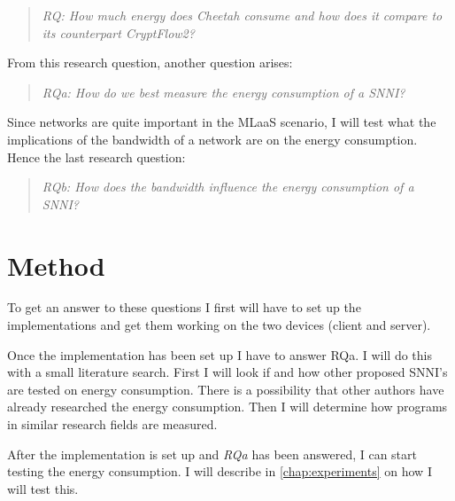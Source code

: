 \documentclass[../thesis.tex]{subfiles}
\begin{document}
\begin{quote} \emph{RQ: How much energy does Cheetah consume and how does it compare to its counterpart CryptFlow2?} \end{quote} 

\noindent From this research question, another question arises:

\begin{quote} \emph{RQa: How do we best measure the energy consumption of a SNNI?} \end{quote}

\noindent Since networks are quite important in the MLaaS scenario, I will test what the implications of the bandwidth of a network are on the energy consumption. Hence the last research question:

\begin{quote}
    \emph{RQb: How does the bandwidth influence the energy consumption of a SNNI?}
\end{quote}


\section{Method}
To get an answer to these questions I first will have to set up the implementations and get them working on the two devices (client and server). 

Once the implementation has been set up I have to answer RQa. I will do this with a small literature search. First I will look if and how other proposed SNNI's are tested on energy consumption. There is a possibility that other authors have already researched the energy consumption. Then I will determine how programs in similar research fields are measured.

After the implementation is set up and \textit{RQa} has been answered, I can start testing the energy consumption. I will describe in \autoref{chap:experiments} on how I will test this.
\end{document}
